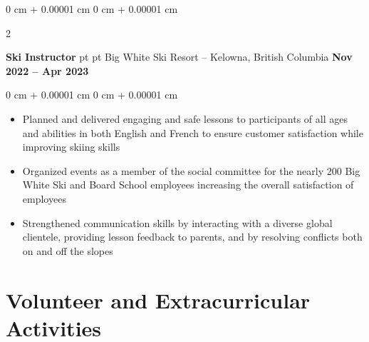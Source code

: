 \documentclass[10pt, letterpaper]{article}
\newenvironment{highlights}{
    \begin{itemize}[
        topsep=0.10 cm,
        parsep=0.10 cm,
        partopsep=0pt,
        itemsep=0pt,
        leftmargin=0 cm + 10pt
    ]
}{
    \end{itemize}
} %
\newenvironment{onecolentry}{
    \begin{adjustwidth}{
        0 cm + 0.00001 cm
    }{
        0 cm + 0.00001 cm
    }
}{
    \end{adjustwidth}
} %
\newenvironment{twocolentry}[2][]{
    \onecolentry
    \def\secondColumn{#2}
    \setcolumnwidth{\fill, 4.5 cm}
    \begin{paracol}{2}
}{
    \switchcolumn \raggedleft \secondColumn
    \end{paracol}
    \endonecolentry
} %
\begin{document}
        \vspace{0.2 cm}

        \begin{twocolentry}{
            \textbf{Nov 2022 – Apr 2023}
        }
            \textbf{Ski Instructor} pt\AND {} pt Big White Ski Resort -- Kelowna, British Columbia\end{twocolentry}

        \vspace{0.10 cm}
        \begin{onecolentry}
            \begin{highlights}
                \item Planned and delivered engaging and safe lessons to participants of all ages and abilities in both English and French to ensure customer satisfaction while improving skiing skills
                \item Organized events as a member of the social committee for the nearly 200 Big White Ski and Board School employees increasing the overall satisfaction of employees
                \item Strengthened communication skills by interacting with a diverse global clientele, providing lesson feedback to parents, and by resolving conflicts both on and off the slopes

            \end{highlights}
        \end{onecolentry}



    
    \section{Volunteer and Extracurricular Activities}
\end{document}

